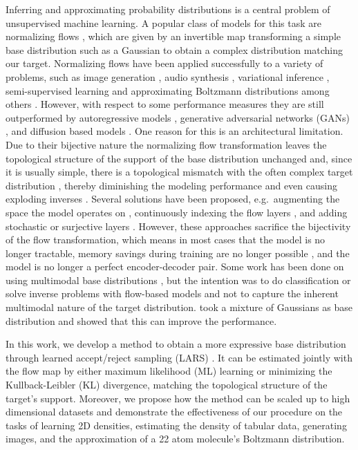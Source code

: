 \documentclass[twoside]{article}
\begin{document}
Inferring and approximating probability distributions is a central problem of unsupervised machine learning. A popular class of models for this task are normalizing flows \citep{Tabak2010,Tabak2013,Rezende2015}, which are given by an invertible map transforming a simple base distribution such as a Gaussian to obtain a complex distribution matching our target. Normalizing flows have been applied successfully to a variety of problems, such as image generation \citep{Dinh2015,Dinh2017,Kingma2018,Ho2019,Grcic2021}, audio synthesis \citep{Oord2018}, variational inference \citep{Rezende2015}, semi-supervised learning \citep{Izmailov2020} and approximating Boltzmann distributions \citep{Noe2019,Wu2020,Wirnsberger2020} among others \citep{Papamakarios2021}. However, with respect to some performance measures they are still outperformed by autoregressive models \citep{Chen2018,Parmar2018,Child2019}, generative adversarial networks (GANs) \citep{Gulrajani2017,Karras2019,Karras2020a,Karras2020}, and diffusion based models \citep{Sohl-Dickstein2015,Kingma2021}. One reason for this is an architectural limitation. Due to their bijective nature the normalizing flow transformation leaves the topological structure of the support of the base distribution unchanged and, since it is usually simple, there is a topological mismatch with the often complex target distribution \citep{Cornish2020}, thereby diminishing the modeling performance and even causing exploding inverses \citep{Behrmann2021}. Several solutions have been proposed, e.g.\ augmenting the space the model operates on \citep{Huang2020}, continuously indexing the flow layers \citep{Cornish2020}, and adding stochastic \citep{Wu2020} or surjective layers \citep{Nielsen2020}. However, these approaches sacrifice the bijectivity of the flow transformation, which means in most cases that the model is no longer tractable, memory savings during training are no longer possible \citep{Gomez2017}, and the model is no longer a perfect encoder-decoder pair. Some work has been done on using multimodal base distributions \citep{Izmailov2020,Ardizzone2020,Hagemann2021}, but the intention was to do classification or solve inverse problems with flow-based models and not to capture the inherent multimodal nature of the target distribution. \cite{Papamakarios2017} took a mixture of Gaussians as base distribution and showed that this can improve the performance.

In this work, we develop a method to obtain a more expressive base distribution through learned accept/reject sampling (LARS) \citep{Bauer2019}. It can be estimated jointly with the flow map by either maximum likelihood (ML) learning or minimizing the Kullback-Leibler (KL) divergence, matching the topological structure of the target's support. Moreover, we propose how the method can be scaled up to high dimensional datasets and demonstrate the effectiveness of our procedure on the tasks of learning 2D densities, estimating the density of tabular data, generating images, and the approximation of a 22 atom molecule's Boltzmann distribution.
\end{document}
